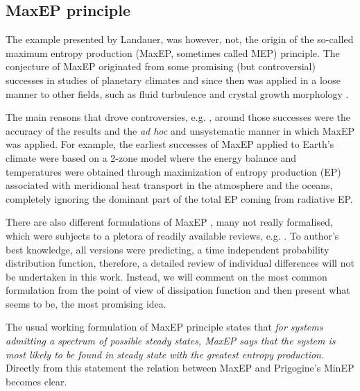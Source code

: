 \documentclass[a4paper,12pt]{article}
\begin{document}
\subsection{MaxEP principle}
\label{MaxEPSection}
The example presented by Landauer, was however, not, the origin of the so-called maximum entropy production (MaxEP, sometimes called MEP) principle. The conjecture of MaxEP originated from some promising (but controversial) successes in studies of planetary climates \cite{Lorenz:J80tzZkl, Paltridge:2007jf, Kleidon:1339033} and since then was applied in a loose manner to other fields, such as fluid turbulence \cite{Ozawa:2003jt, MALKUS:2003ix} and crystal growth morphology \cite{Martyushev:2006ge}.

The main reasons that drove controversies, e.g. \cite{Goody:2007cv}, around those successes were the accuracy of the results and the \textit{ad hoc} and unsystematic manner in which MaxEP was applied.
For example, the earliest successes of MaxEP applied to Earth's climate were based on a 2-zone model where the energy balance and temperatures were obtained through maximization of entropy production (EP) associated with meridional heat transport in the atmosphere and the oceans, completely ignoring the dominant part of the total EP coming from radiative EP.

There are also different formulations of MaxEP \cite{Virgo:2010it, Zupanovic:2010ea, Kawazura:2010dy, Dewar:2005da}, many not really formalised, which were subjects to a pletora of readily available reviews, e.g. \cite{Bruers:2006us, Zupanovic:2010bv, Dewar:2014ek}. To author's best knowledge, all versions were predicting, a time independent probability distribution function, therefore, a detailed review of individual differences will not be undertaken in this work.
Instead, we will comment on the most common formulation from the point of view of dissipation function and then present what seems to be, the most promising idea.

The usual working formulation of MaxEP  principle states that \textit{for systems admitting a spectrum of possible steady states, MaxEP says that the system is most likely to be found in steady state  with the greatest entropy production}. Directly from this statement the relation between MaxEP and Prigogine's MinEP becomes clear.
\end{document}
